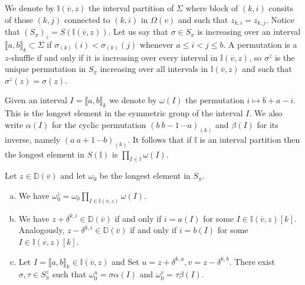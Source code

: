 \documentclass[11pt,fleqn]{amsart}
\newcommand\vv{\overline{v}}
\newcommand\II{\mathbb I}
\newcommand\interval[1]{\llbracket #1 \rrbracket}
\newcommand\DD{\mathbb D}
\begin{document}
We denote by $\II(\vv,z)$ the interval partition of $\Sigma$ where block of
$(k,i)$ consits of those $(k,j)$ connected to $(k,i)$ in $\Omega(v)$ and such
that $z_{k,i} = z_{k,j}$. Notice that $(S_\pi)_z = S(\II(\vv, z))$. Let 
us say that $\sigma \in S_\pi$ is increasing over an interval 
$\interval{a,b}_k \subset \Sigma$ if $\sigma_{(k)}(i) < \sigma_{(k)}(j)$ 
whenever $a \leq i < j \leq b$. A permutation is a $z$-shuffle if and only if 
it is increasing over every interval in $\II(\vv, z)$, so $\sigma^z$ is the 
unique permutation in $S_\pi$ increasing over all intervals in $\II(\vv, z)$ 
and such that $\sigma^z(z) = \sigma(z)$.

Given an interval $I = \interval{a,b}_k$ we denote by $\omega(I)$ the 
permutation $i \mapsto  b+a-i$. This is the longest element in the symmetric
group of the interval $I$. We also write $\alpha(I)$ for the cyclic 
permutation $(b \ b-1 \ \cdots a)_{(k)}$ and $\beta(I)$ for its inverse, 
namely $(a \ a+1 \ \cdots b)_{(k)}$. It follows that if $\II$ is an interval 
partition then the longest element in $S(\II)$ is $\prod_{I\in\II} \omega(I)$.
\begin{Lemma}
\label{L:omega-delta}
Let $z\in \DD(\vv)$ and let $\omega_0$ be the longest element in $S_\pi$.
\begin{enumerate}[(a)]
\item 
\label{i:omega-z}
We have $\omega_0^z = \omega_0 \prod_{I \in \II(\vv, z)} \omega(I)$.

\item 
\label{i:D-delta}
We have $z + \delta^{k,i} \in \DD(\vv)$ if and only if $i = a(I)$ for some $I 
	\in \II(\vv,z)[k]$. Analogously, $z - \delta^{k,i} \in \DD(\vv)$ if and 
	only if $i = b(I)$ for some $I \in \II(\vv,z)[k]$.

\item 
\label{i:omega-delta}
Let $I = \interval{a,b}_k \in \II(\vv,z)$ and Set $u=z+\delta^{k,a}, v=z- 
\delta^{k,b}$. There exist $\sigma, \tau \in S_\pi^z$ such that 
$\omega_0^u = \sigma \alpha(I)$ and $\omega_0^v = \tau \beta(I)$. 
\end{enumerate}
\end{Lemma}
\end{document}
